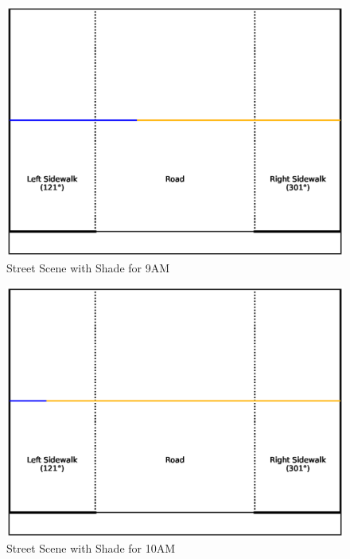 \documentclass[nohyperref]{article}
\theoremstyle{plain}
\theoremstyle{definition}
\theoremstyle{remark}
\begin{document}
\begin{figure}[ht]
\begin{center}
\centerline{\includegraphics[width=\columnwidth]{sidewalk_predictions/shade_at_9}}
\caption{Street Scene with Shade for 9AM}
\end{center}
\end{figure}

\begin{figure}[ht]
\begin{center}
\centerline{\includegraphics[width=\columnwidth]{sidewalk_predictions/shade_at_10}}
\caption{Street Scene with Shade for 10AM}
\end{center}
\end{figure}
\end{document}
